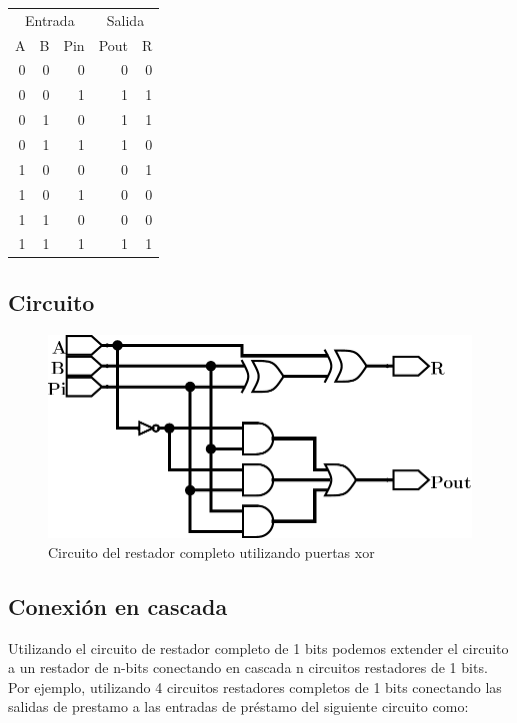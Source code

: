 \documentclass[
]{book}
\begin{document}
{\begin{table}
\centering
\begin{tabular}{r|r|r|r|r}
\hline
\multicolumn{3}{c|}{Entrada} & \multicolumn{2}{c}{Salida} \\
\cline{1-3} \cline{4-5}
A & B & Pin & Pout & R\\
\hline
0 & 0 & 0 & 0 & 0\\
\hline
0 & 0 & 1 & 1 & 1\\
\hline
0 & 1 & 0 & 1 & 1\\
\hline
0 & 1 & 1 & 1 & 0\\
\hline
1 & 0 & 0 & 0 & 1\\
\hline
1 & 0 & 1 & 0 & 0\\
\hline
1 & 1 & 0 & 0 & 0\\
\hline
1 & 1 & 1 & 1 & 1\\
\hline
\end{tabular}
\end{table}

\hypertarget{circuito}{%
\subsection{Circuito}\label{circuito}}

\begin{figure}

{\centering \includegraphics[width=0.6\linewidth]{./images/circRestadorCompleto} 

}

\caption{Circuito del restador completo utilizando puertas xor}\label{fig:unnamed-chunk-5}
\end{figure}

\hypertarget{conexiuxf3n-en-cascada}{%
\subsection{Conexión en cascada}\label{conexiuxf3n-en-cascada}}

Utilizando el circuito de restador completo de 1 bits podemos extender el circuito a un restador de n-bits conectando en cascada n circuitos restadores de 1 bits. Por ejemplo, utilizando 4 circuitos restadores completos de 1 bits conectando las salidas de prestamo a las entradas de préstamo del siguiente circuito como:

}
\end{document}
